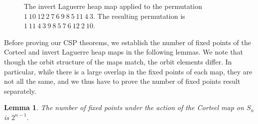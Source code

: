\documentclass{amsart}
\newtheorem{lem}[thm]{Lemma}
\theoremstyle{definition}
\begin{document}
\begin{figure}
\begin{minipage}[c]{4.5cm}
\end{minipage}
  \caption{The invert Laguerre heap map applied to the permutation $1~10~12~2~7~6~9~8~5~11~4~3$. The resulting permutation is $1~11~4~3~9~8~5~7~6~12~2~10.$ }\label{fig: LaguerreHeap} 
\end{figure}


Before proving our  CSP theorems, we establish the number of fixed points of the Corteel and invert Laguerre heap maps in the following lemmas. We note that though the orbit structure of the  maps match, the orbit elements differ.  In particular, while there is a large overlap in the fixed points of each map, they are not all the same, and we thus have to prove the number of fixed points result separately.

\begin{lem}\label{lem: Corteel fixed pts}  The number of fixed points under the action of the Corteel map on $S_n$ is $2^{n-1}.$
\end{lem}
\end{document}
